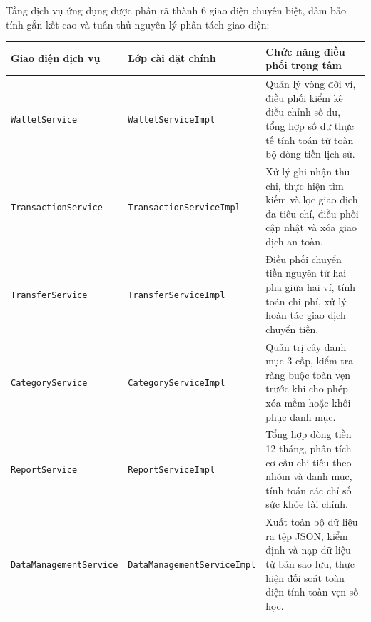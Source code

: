 \documentclass[a4paper,12pt]{report}
\newcommand{\passthrough}[1]{#1}
\newcounter{none}
\begin{document}
Tầng dịch vụ ứng dụng được phân rã thành 6 giao diện chuyên biệt, đảm
bảo tính gắn kết cao và tuân thủ nguyên lý phân tách giao diện:

{\def\LTcaptype{none} %
\begin{longtable}[]{@{}
  >{\raggedright\arraybackslash}p{}
  >{\raggedright\arraybackslash}p{}
  >{\raggedright\arraybackslash}p{}@{}}
\toprule\noalign{}
\begin{minipage}[b]{\linewidth}\raggedright
Giao diện dịch vụ
\end{minipage} & \begin{minipage}[b]{\linewidth}\raggedright
Lớp cài đặt chính
\end{minipage} & \begin{minipage}[b]{\linewidth}\raggedright
Chức năng điều phối trọng tâm
\end{minipage} \\
\midrule\noalign{}
\endhead
\bottomrule\noalign{}
\endlastfoot
\passthrough{\lstinline!WalletService!} &
\passthrough{\lstinline!WalletServiceImpl!} & Quản lý vòng đời ví, điều
phối kiểm kê điều chỉnh số dư, tổng hợp số dư thực tế tính toán từ toàn
bộ dòng tiền lịch sử. \\
\passthrough{\lstinline!TransactionService!} &
\passthrough{\lstinline!TransactionServiceImpl!} & Xử lý ghi nhận thu
chi, thực hiện tìm kiếm và lọc giao dịch đa tiêu chí, điều phối cập nhật
và xóa giao dịch an toàn. \\
\passthrough{\lstinline!TransferService!} &
\passthrough{\lstinline!TransferServiceImpl!} & Điều phối chuyển tiền
nguyên tử hai pha giữa hai ví, tính toán chi phí, xử lý hoàn tác giao
dịch chuyển tiền. \\
\passthrough{\lstinline!CategoryService!} &
\passthrough{\lstinline!CategoryServiceImpl!} & Quản trị cây danh mục 3
cấp, kiểm tra ràng buộc toàn vẹn trước khi cho phép xóa mềm hoặc khôi
phục danh mục. \\
\passthrough{\lstinline!ReportService!} &
\passthrough{\lstinline!ReportServiceImpl!} & Tổng hợp dòng tiền 12
tháng, phân tích cơ cấu chi tiêu theo nhóm và danh mục, tính toán các
chỉ số sức khỏe tài chính. \\
\passthrough{\lstinline!DataManagementService!} &
\passthrough{\lstinline!DataManagementServiceImpl!} & Xuất toàn bộ dữ
liệu ra tệp JSON, kiểm định và nạp dữ liệu từ bản sao lưu, thực hiện đối
soát toàn diện tính toàn vẹn số học. \\
\end{longtable}
}
\end{document}
